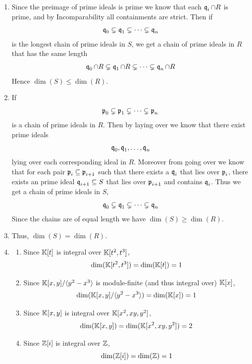\documentclass[Notebook.tex]{subfiles}
\begin{document}
\begin{solution}
    \bbni
    \begin{enumerate}
        \item Since the preimage of prime ideals is prime we know that each $\operatorname{\mathfrak{q}}_i \cap R$ is prime, and by Incomparability all containments are strict. Then if  
        \[
        \operatorname{\mathfrak{q}}_0\subsetneq \operatorname{\mathfrak{q}}_1\subsetneq\cdots\subsetneq \operatorname{\mathfrak{q}}_n
        \]
        is the longest chain of prime ideals in $S$, we get a chain of prime ideals in $R$ that has the same length
        \[
        \operatorname{\mathfrak{q}}_0\cap R\subsetneq \operatorname{\mathfrak{q}}_1\cap R\subsetneq\cdots\subsetneq \operatorname{\mathfrak{q}}_n\cap R
        \]
        Hence $\dim(S) \leq \dim(R)$. 

        \item If \[
        \operatorname{\mathfrak{p}}_0\subsetneq \operatorname{\mathfrak{p}}_1\subsetneq\cdots\subsetneq \operatorname{\mathfrak{p}}_n
        \]
        is a chain of prime ideals in $R$. Then by laying over we know that there exist prime ideals 
        \[
        \operatorname{\mathfrak{q}}_0, \operatorname{\mathfrak{q}}_1, \ldots, \operatorname{\mathfrak{q}}_n
        \]
        lying over each corresponding ideal in $R$. Moreover from going over we know that for each pair $\operatorname{\mathfrak{p}}_i \subseteq \operatorname{\mathfrak{p}}_{i+1}$ such that there exists a $\operatorname{\mathfrak{q}}_i$ that lies over $\operatorname{\mathfrak{p}}_i$, there exists an prime ideal $\operatorname{\mathfrak{q}}_{i+1} \subseteq S$ that lies over $\operatorname{\mathfrak{p}}_{i+1}$ and contains $\operatorname{\mathfrak{q}}_i$. Thus we get a chain of prime ideals in $S$,
        \[
        \operatorname{\mathfrak{q}}_0\subsetneq \operatorname{\mathfrak{q}}_1\subsetneq\cdots\subsetneq \operatorname{\mathfrak{q}}_n
        \]
        Since the chains are of equal length we have $\dim (S) \geq \dim(R)$. 

        \item Thus, $\dim(S) = \dim(R)$. 
        
        \item \begin{enumerate}
            \item Since $\mathbb K[t]$ is integral over $\mathbb K[t^2, t^3]$, 
            \[\dim(\mathbb K[t^2, t^3]) = \dim (\mathbb K[t]) = 1\]
            \item Since $\mathbb K[x, y]/\langle y^2 - x^3 \rangle$ is module-finite (and thus integral over) $\mathbb K[x]$, 
            \[\dim(\mathbb K[x, y]/\langle y^2 - x^3 \rangle) = \dim (\mathbb K[x]) = 1\]
            \item Since $\mathbb K[x,y]$ is integral over $\mathbb K[x^2, xy, y^2]$,
            \[\dim(\mathbb K[x, y]) = \dim (\mathbb K[x^2, xy, y^2]) = 2\]
            \item Since $\mathbb Z[i]$ is integral over $\mathbb Z$,
            \[\dim(\mathbb Z[i]) = \dim (\mathbb Z) = 1\]
        \end{enumerate}
    \end{enumerate}
\end{solution}
\end{document}
